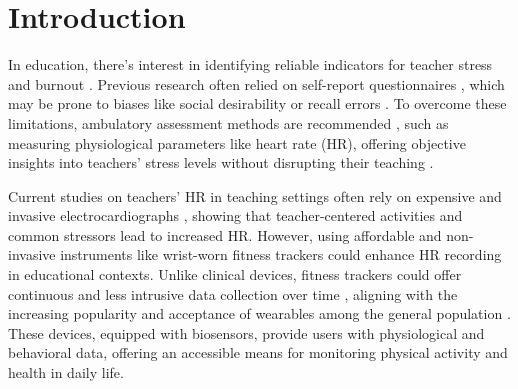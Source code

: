 \documentclass[preprint, 3p,
authoryear]{elsarticle} %
\begin{document}
\section{Introduction}\label{introduction}

In education, there's interest in identifying reliable indicators for
teacher stress and burnout \citep{fisher2011, junker2021}. Previous
research often relied on self-report questionnaires
\citep{chaplain2008, liu2020}, which may be prone to biases like social
desirability \citep{razavi2001self} or recall errors
\citep{van2016accuracy}. To overcome these limitations, ambulatory
assessment methods are recommended
\citep{trull2013ambulatory, wettstein2020ambulatory}, such as measuring
physiological parameters like heart rate (HR), offering objective
insights into teachers' stress levels without disrupting their teaching
\citep{donker2018, runge2020}.

Current studies on teachers' HR in teaching settings often rely on
expensive and invasive electrocardiographs
\citep{sperka1995, scheuch1997psychophysische, donker2018, junker2021, huang2022class},
showing that teacher-centered activities and common stressors lead to
increased HR. However, using affordable and non-invasive instruments
like wrist-worn fitness trackers \citep{ferguson2015} could enhance HR
recording in educational contexts. Unlike clinical devices, fitness
trackers could offer continuous and less intrusive data collection over
time \citep{godfrey2018z}, aligning with the increasing popularity and
acceptance of wearables among the general population
\citep{peng2022acceptance}. These devices, equipped with biosensors,
provide users with physiological and behavioral data, offering an
accessible means for monitoring physical activity and health in daily
life.
\end{document}
